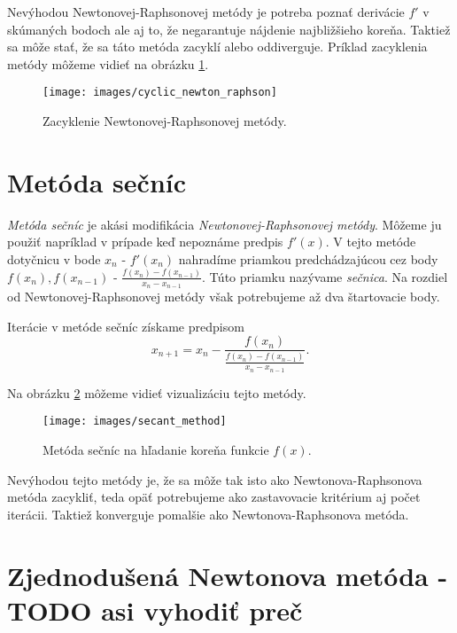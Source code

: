 Nevýhodou Newtonovej-Raphsonovej metódy je potreba poznať derivácie $f'$ v skúmaných bodoch ale aj to, 
že negarantuje nájdenie
najbližšieho koreňa. Taktiež sa môže stať, že sa táto metóda zacyklí alebo oddiverguje. 
Príklad zacyklenia metódy môžeme vidieť
na obrázku \ref{obr:cyclic_newton_raphson}.

\begin{figure}
    \centerline{\texttt{[image: images/cyclic\_newton\_raphson]}}
    \caption[Zacyklenie Newtonovej-Raphsonovej metódy]{Zacyklenie Newtonovej-Raphsonovej metódy.}
    \label{obr:cyclic_newton_raphson}
\end{figure}

\section{Metóda sečníc}

\textit{Metóda sečníc} je akási modifikácia \textit{Newtonovej-Raphsonovej metódy}. 
Môžeme ju použiť napríklad v prípade keď nepoznáme predpis $f'(x)$. 
V tejto metóde dotyčnicu v bode $x_n$ - $f'(x_n)$ nahradíme priamkou 
predchádzajúcou cez body $f(x_n), f(x_{n-1})$ - $\frac{f(x_n) - f(x_{n-1})}{x_n - x_{n-1}}$. 
Túto priamku nazývame \textit{sečnica}. 
Na rozdiel od Newtonovej-Raphsonovej metódy však potrebujeme až dva štartovacie body.

Iterácie v metóde sečníc získame predpisom
$$ x_{n+1} = x_n - \frac{f(x_n)}{\frac{f(x_n) - f(x_{n-1})}{x_n - x_{n-1}}}.$$

Na obrázku \ref{obr:secant_method} môžeme vidieť vizualizáciu tejto metódy.

\begin{figure}
    \centerline{\texttt{[image: images/secant\_method]}}
    \caption[Metóda sečníc]{Metóda sečníc na hľadanie koreňa funkcie $f(x)$.}
    \label{obr:secant_method}
\end{figure}

Nevýhodou tejto metódy je, že sa môže tak isto ako Newtonova-Raphsonova metóda zacykliť, teda 
opäť potrebujeme ako zastavovacie kritérium aj počet iterácii. Taktiež konverguje
pomalšie ako Newtonova-Raphsonova metóda.

\iffalse
\section{Zjednodušená Newtonova metóda - TODO asi vyhodiť preč}

